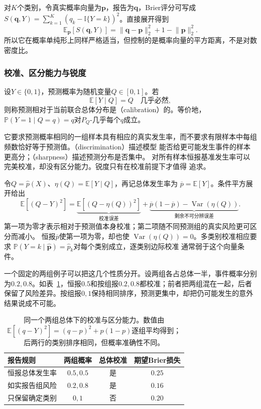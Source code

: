 对\(K\)个类别，令真实概率向量为\(\bm p\)，报告为\(\bm q\)，Brier评分可写成
\(S(\bm q,Y)=\sum_{k=1}^K(q_k-\mathbb{I}\{Y=k\})^2\)。直接展开得到
\[
  \mathbb{E}_{\bm p}[S(\bm q,Y)]
  =\lVert\bm q-\bm p\rVert_2^2
   +1-\lVert\bm p\rVert_2^2.
\]
所以它在概率单纯形上同样严格适当，但控制的是概率向量的平方距离，不是对数密度比。

\subsubsection{校准、区分能力与锐度}

\begin{definition}[二元概率校准]
  \label{def:statistics-probability-calibration}
  设\(Y\in\{0,1\}\)，预测概率为随机变量\(Q\in[0,1]\)。若
  \[ \mathbb E[Y\mid Q]=Q\quad\text{几乎必然}, \]
  则称预测相对于当前联合总体分布是（calibration）的。等价地，\(\mathbb P(Y=1\mid Q=q)=q\)对\(P_Q\)-几乎每个\(q\)成立。
\end{definition}
它要求预测概率相同的一组样本具有相应的真实发生率，而不要求有限样本中每组频数恰好等于预测值。（discrimination）描述模型
能否给更可能发生事件的样本更高分；（sharpness）描述预测分布是否集中。
对所有样本恒报基准发生率可以完美校准，却没有区分能力。锐度只有在校准前提下才值得
追求。

令\(Q=\widehat p(X)\)、\(\eta(Q)=\mathbb{E}[Y\mid Q]\)，再记总体发生率为
\(\overline p=\mathbb{E}[Y]\)。条件平方展开给出
\[
  \mathbb{E}[(Q-Y)^2]
  =
  \underbrace{\mathbb{E}[(Q-\eta(Q))^2]}_{\text{校准误差}}
  +\underbrace{\overline p(1-\overline p)
    -\operatorname{Var}(\eta(Q))}_{\text{剩余不可分辨误差}}.
\]
第一项为零才表示相对于预测值本身校准；第二项随不同预测组的真实风险更可区分而减小。
恒报\(\overline p\)使第一项为零，却也使
\(\operatorname{Var}(\eta(Q))=0\)。多类别校准相应要求
\(\mathbb{P}(Y=k\mid\widehat{\bm p})=\widehat p_k\)对每个类别成立，逐类别边际校准
通常弱于这个向量条件。

一个固定的两组例子可以把这几个性质分开。设两组各占总体一半，事件概率分别为\(0.2,0.8\)。如表~\ref{tab:statistics-calibration-discrimination}，恒报\(0.5\)和按组报\(0.2,0.8\)都校准；前者把两组混在一起，后者保留了风险差异。按组报\(0,1\)保持相同排序，预测更集中，却把仍可能发生的意外结果说成不可能。
\begin{table}[htbp]
  \centering
  \small
  \begin{tabular}{lccc}
    \toprule
    报告规则 & 两组概率 & 总体校准 & 期望Brier损失 \\
    \midrule
    恒报总体发生率 & \(0.5,0.5\) & 是 & \(0.25\) \\
    如实报告组风险 & \(0.2,0.8\) & 是 & \(0.16\) \\
    只保留确定类别 & \(0,1\) & 否 & \(0.20\) \\
    \bottomrule
  \end{tabular}
  \caption{同一个两组总体下的校准与区分能力。数值由\(\mathbb E[(q-Y)^2]=(q-p)^2+p(1-p)\)逐组平均得到；后两行的类别排序相同，但概率准确性不同。}
  \label{tab:statistics-calibration-discrimination}
\end{table}

